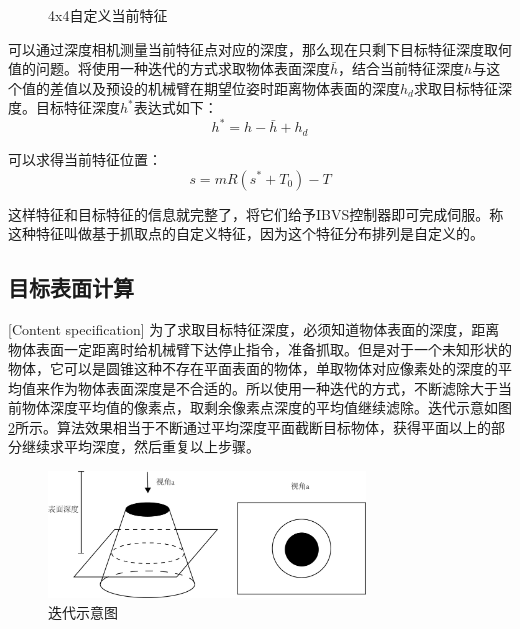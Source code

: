 \documentclass[fontset=fandol,type=bachelor,campus=harbin]{hithesisbook}
\begin{document}
\begin{figure}[h]
{\begin{minipage}[h]{0.4\textwidth}
		\end{minipage}
		\label{44自定义目标特征}
	}
	\caption{4x4自定义当前特征}
	\label{基于抓取点的4x4自定义特征}
\end{figure}


可以通过深度相机测量当前特征点对应的深度，那么现在只剩下目标特征深度取何值的问题。将使用一种迭代的方式求取物体表面深度$\bar{h}$，结合当前特征深度$h$与这个值的差值以及预设的机械臂在期望位姿时距离物体表面的深度$h_d$求取目标特征深度。目标特征深度$h^*$表达式如下：
\begin{equation}
h^*=h-\bar{h}+h_d
\label{目标特征深度}
\end{equation}


可以求得当前特征位置：
\begin{equation}
s=mR\left( s^*+T_0 \right) -T
\label{当前特征位置}
\end{equation}


这样特征和目标特征的信息就完整了，将它们给予IBVS控制器即可完成伺服。称这种特征叫做基于抓取点的自定义特征，因为这个特征分布排列是自定义的。
\subsection{目标表面计算}[Content specification]
为了求取目标特征深度，必须知道物体表面的深度，距离物体表面一定距离时给机械臂下达停止指令，准备抓取。但是对于一个未知形状的物体，它可以是圆锥这种不存在平面表面的物体，单取物体对应像素处的深度的平均值来作为物体表面深度是不合适的。所以使用一种迭代的方式，不断滤除大于当前物体深度平均值的像素点，取剩余像素点深度的平均值继续滤除。迭代示意如图\ref{迭代示意图}所示。算法效果相当于不断通过平均深度平面截断目标物体，获得平面以上的部分继续求平均深度，然后重复以上步骤。
\begin{figure}[h]
\centering
\includegraphics[width = 0.75\textwidth]{chapter4/迭代示意图}
\caption{迭代示意图}
\label{迭代示意图}
\end{figure}
\end{document}
